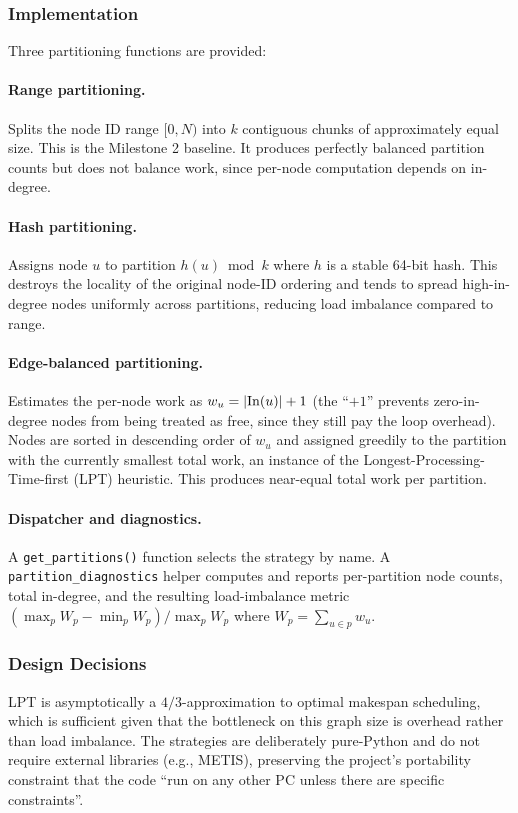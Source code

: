 \documentclass[11pt,a4paper]{article}
\begin{document}
\subsubsection{Implementation}
Three partitioning functions are provided:

\paragraph{Range partitioning.} Splits the node ID range $[0, N)$ into
$k$ contiguous chunks of approximately equal size. This is the
Milestone 2 baseline. It produces perfectly balanced partition counts
but does not balance work, since per-node computation depends on
in-degree.

\paragraph{Hash partitioning.} Assigns node $u$ to partition
$h(u) \bmod k$ where $h$ is a stable 64-bit hash. This destroys the
locality of the original node-ID ordering and tends to spread
high-in-degree nodes uniformly across partitions, reducing load
imbalance compared to range.

\paragraph{Edge-balanced partitioning.} Estimates the per-node work as
$w_u = |{\rm In}(u)| + 1$ (the ``$+1$'' prevents zero-in-degree nodes
from being treated as free, since they still pay the loop overhead).
Nodes are sorted in descending order of $w_u$ and assigned greedily to
the partition with the currently smallest total work, an instance of
the Longest-Processing-Time-first (LPT) heuristic. This produces
near-equal total work per partition.

\paragraph{Dispatcher and diagnostics.} A \texttt{get\_partitions()}
function selects the strategy by name. A \texttt{partition\_diagnostics}
helper computes and reports per-partition node counts, total in-degree,
and the resulting load-imbalance metric
$(\max_{p} W_p - \min_{p} W_p) / \max_{p} W_p$ where
$W_p = \sum_{u \in p} w_u$.

\subsubsection{Design Decisions}
LPT is asymptotically a $4/3$-approximation to optimal makespan
scheduling, which is sufficient given that the bottleneck on this
graph size is overhead rather than load imbalance. The strategies are
deliberately pure-Python and do not require external libraries (e.g.,
METIS), preserving the project's portability constraint that the code
``run on any other PC unless there are specific constraints''.
\end{document}
